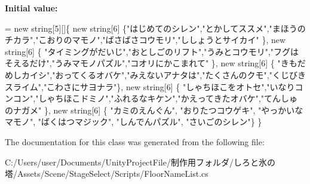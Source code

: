 {\bfseries Initial value\+:}
\begin{DoxyCode}
= \textcolor{keyword}{new} \textcolor{keywordtype}{string}[5][]\{
        \textcolor{keyword}{new} \textcolor{keywordtype}{string}[6]  \{\textcolor{stringliteral}{"はじめてのシレン"},\textcolor{stringliteral}{"とかしてススメ"},\textcolor{stringliteral}{"まほうのチカラ"},\textcolor{stringliteral}{"こおりのマモノ"},\textcolor{stringliteral}{"ばさばさコウモリ"},\textcolor{stringliteral}{"ししょうとサイカイ"} \},
        \textcolor{keyword}{new} \textcolor{keywordtype}{string}[6]  \{ \textcolor{stringliteral}{"タイミングがだいじ"},\textcolor{stringliteral}{"おとしごのリフト"},\textcolor{stringliteral}{"うみとコウモリ"},\textcolor{stringliteral}{"フグはそえるだけ"},\textcolor{stringliteral}{"うみマモノパズル"},\textcolor{stringliteral}{"コオリにかこまれて"} \},
        \textcolor{keyword}{new} \textcolor{keywordtype}{string}[6]  \{ \textcolor{stringliteral}{"きもだめしカイシ"},\textcolor{stringliteral}{"おってくるオバケ"},\textcolor{stringliteral}{"みえないアナタは"},\textcolor{stringliteral}{"たくさんのクモ"},\textcolor{stringliteral}{"くじびきスライム"},\textcolor{stringliteral}{"こわさにサヨナラ"}\},
        \textcolor{keyword}{new} \textcolor{keywordtype}{string}[6]  \{ \textcolor{stringliteral}{"しゃちほこをオトセ"},\textcolor{stringliteral}{"いなりコンコン"},\textcolor{stringliteral}{"しゃちほこドミノ"},\textcolor{stringliteral}{"ふれるなキケン"},\textcolor{stringliteral}{"かえってきたオバケ"},\textcolor{stringliteral}{"てんしゅのナガメ"} \},
        \textcolor{keyword}{new} \textcolor{keywordtype}{string}[6]  \{ \textcolor{stringliteral}{"カミのえんぐん"}, \textcolor{stringliteral}{"おりたつコウゲキ"}, \textcolor{stringliteral}{"やっかいなマモノ"}, \textcolor{stringliteral}{"ばくはつマジック"}, \textcolor{stringliteral}{"しんでんパズル"}, \textcolor{stringliteral}{"さいごのシレン"}\}
    \}
\end{DoxyCode}


The documentation for this class was generated from the following file\+:\begin{DoxyCompactItemize}
\item 
C\+:/\+Users/user/\+Documents/\+Unity\+Project\+File/制作用フォルダ/しろと氷の塔/\+Assets/\+Scene/\+Stage\+Select/\+Scripts/Floor\+Name\+List.\+cs\end{DoxyCompactItemize}
